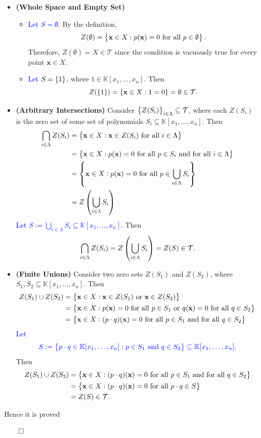 \documentclass[11pt,openany]{article}
\begin{document}
	\begin{itemize}
		\item[(i)] \textbf{(Whole Space and Empty Set)}
		\begin{itemize}
			\item \textcolor{blue}{Let $S=\emptyset$}. By the definition, \[
			Z(\emptyset)=\set{\textbf{x}\in X:p(\textbf{x})=0\ \text{for all}\ p\in\emptyset}.
			\] Therefore, $Z(\emptyset)=X\in\mathcal{T}$ since the condition is vacuously true for every point $\textbf{x}\in X$.
			\item \textcolor{blue}{Let $S=\set{1}$}, where $1\in\mathbb{K}[x_1,\dots,x_n]$. Then \[
			Z(\set{1})=\set{\textbf{x}\in X:1=0}=\emptyset\in\mathcal{T}.
			\]
		\end{itemize}
		\vspace{4pt}
		\item[(ii)] \textbf{(Arbitrary Intersections)} Consider $\set{Z(S_i)}_{i\in\Lambda}\subseteq\mathcal{T}$, where each $Z(S_i)$ is the zero set of some set of polynomials $S_i\subseteq\mathbb{K}[x_1,\dots,x_n]$. Then \begin{align*}
			\bigcap_{i\in\Lambda} Z(S_i)&=\set{\textbf{x}\in X:\textbf{x}\in Z(S_i)\ \text{for all}\ i\in\Lambda}\\
			&=\set{\textbf{x}\in X:p(\textbf{x})=0\ \text{for all}\ p\in S_i\ \text{and for all}\ i\in\Lambda}\\
			&=\set{\textbf{x}\in X:p(\textbf{x})=0\ \text{for all}\ p\in\bigcup_{i\in\Lambda}S_i} \\
			&=Z\of{\bigcup_{i\in\lambda}S_i}
		\end{align*}
		\textcolor{blue}{Let $S:=\bigcup_{i\in\Lambda}S_i\subseteq\mathbb{K}[x_1,\dots,x_n]$}. Then \begin{align*}
			\bigcap_{i\in\Lambda}Z(S_i)=Z\left( \bigcup_{i\in\Lambda}S_i \right)=Z(S)\in\mathcal{T}.
		\end{align*}
		\vspace{4pt}
		\newpage
		\item[(iii)] \textbf{(Finite Unions)} Consider two zero sets $Z(S_1)$ and $Z(S_2)$, where $S_1,S_2\subseteq\mathbb{K}[x_1,\dots,x_n]$. Then
		\begin{align*}
			Z(S_1)\cup Z(S_2)&=\set{\textbf{x}\in X:\textbf{x}\in Z(S_1)\ \text{or}\ \textbf{x}\in Z(S_2)} \\
			&=\set{\textbf{x}\in X:p(\textbf{x})=0\ \text{for all}\ p\in S_1\ \text{or}\ q(\textbf{x})=0\ \text{for all}\ q\in S_2} \\
			&=\set{\textbf{x}\in X:(p\cdot q)(\textbf{x})=0\ \text{for all}\ p\in S_1\ \text{and for all}\ q\in S_2}
		\end{align*}
		\textcolor{blue}{Let} \[
		\textcolor{blue}{S:=\set{p\cdot q\in\mathbb{K}[x_1,\dots,x_n]:p\in S_1\ \text{and}\ q\in S_2}\subseteq\mathbb{K}[x_1,\dots,x_n]}.
		\] Then \begin{align*}
			Z(S_1)\cup Z(S_2)&=\set{\textbf{x}\in X:(p\cdot q)(\textbf{x})=0\ \text{for all}\ p\in S_1\ \text{and for all}\ q\in S_2}\\
			&=\set{\textbf{x}\in X:(p\cdot q)(\textbf{x})=0\ \text{for all}\ p\cdot q\in S} \\
			&=Z(S)\in\mathcal{T}.
		\end{align*}
	\end{itemize} Hence it is proved
	\begin{flushright}
		$\qed$
	\end{flushright}
\end{document}
